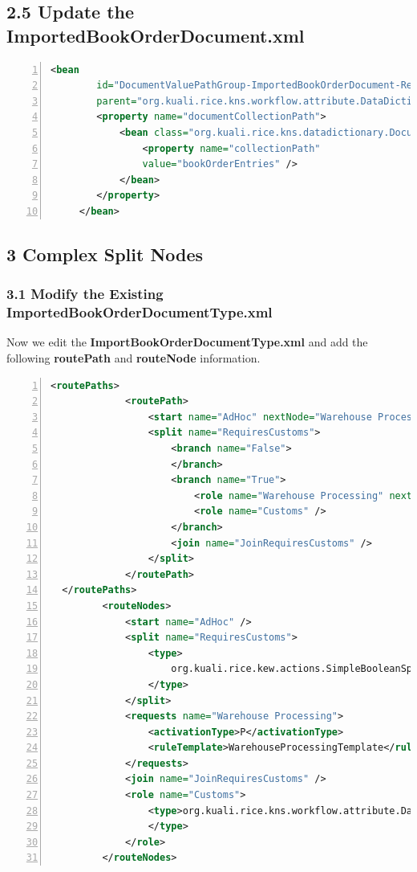 \subsection*{2.5 Update the ImportedBookOrderDocument.xml}
\begin{lstlisting}[numbers=left,language=xml,basicstyle=\scriptsize,backgroundcolor=\color{ubergray},caption={ImportBookOrderDocument.xml},frame=single,breaklines=true]
	<bean
		id="DocumentValuePathGroup-ImportedBookOrderDocument-RequiresCustoms-bookOrderEntries"
		parent="org.kuali.rice.kns.workflow.attribute.DataDictionaryQualifierResolver">
		<property name="documentCollectionPath">
			<bean class="org.kuali.rice.kns.datadictionary.DocumentCollectionPath">
				<property name="collectionPath"
                value="bookOrderEntries" />
            </bean>
        </property>
     </bean>

\end{lstlisting}

\subsection*{3 Complex Split Nodes}

\subsubsection*{3.1 Modify the Existing ImportedBookOrderDocumentType.xml}

Now we edit the \textbf{ImportBookOrderDocumentType.xml} and add the
following \textbf{routePath} and \textbf{routeNode} information.
\begin{lstlisting}[numbers=left,language=xml,basicstyle=\scriptsize,backgroundcolor=\color{ubergray},caption={ImportBookOrderDocumentType.xml},frame=single,breaklines=true]
 <routePaths>
   			 <routePath>
   				 <start name="AdHoc" nextNode="Warehouse Processing" />
   				 <split name="RequiresCustoms"> 
                     <branch name="False">  
                     </branch> 
                     <branch name="True">
     				     <role name="Warehouse Processing" nextNode="Customs" />
     				     <role name="Customs" />
   				     </branch> 
                     <join name="JoinRequiresCustoms" /> 
                 </split>
   			 </routePath>
  </routePaths>
   		 <routeNodes>
   			 <start name="AdHoc" />
   			 <split name="RequiresCustoms">
   				 <type>
   					 org.kuali.rice.kew.actions.SimpleBooleanSplitNode
   				 </type>
   			 </split>
   			 <requests name="Warehouse Processing">
   				 <activationType>P</activationType>
   				 <ruleTemplate>WarehouseProcessingTemplate</ruleTemplate>
   			 </requests>
   			 <join name="JoinRequiresCustoms" />
   			 <role name="Customs">
   				 <type>org.kuali.rice.kns.workflow.attribute.DataDictionaryQualifierResolver
   				 </type>
   			 </role>
         </routeNodes>
\end{lstlisting}

